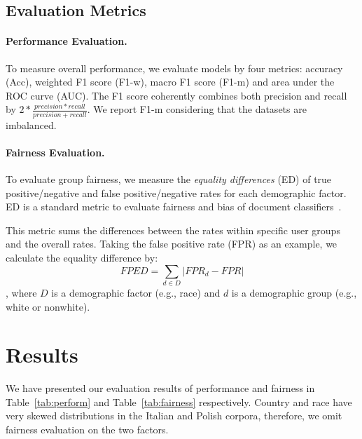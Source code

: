 \subsection{Evaluation Metrics}

\paragraph{Performance Evaluation.}
To measure overall performance, we evaluate models by four metrics: accuracy (Acc), weighted F1 score (F1-w), macro F1 score (F1-m) and area under the ROC curve (AUC). %
The F1 score coherently combines both precision and recall by $2*\frac{precision*recall}{precision+recall}$.
We report F1-m considering that the datasets are imbalanced.

\paragraph{Fairness Evaluation.}
To evaluate {group fairness}, we measure the \textit{equality differences} (ED) of true positive/negative and false positive/negative rates for each demographic factor. 
ED is a standard metric to evaluate fairness and bias of document classifiers~\cite{dixon2018measuring,park2018reducing,garg2019counterfactual}.

This metric sums the differences between the rates within specific user groups and the overall rates.
Taking the false positive rate (FPR) as an example, we calculate the equality difference by:
$$FPED = \sum_{d \in D}|FPR_d - FPR|$$
, where $D$ is a demographic factor (e.g., race) and $d$ is a demographic group (e.g., white or nonwhite).


\section{Results}
We have presented our evaluation results of performance and fairness in Table~\ref{tab:perform} and Table~\ref{tab:fairness} respectively.
Country and race have very skewed distributions in the Italian and Polish corpora, therefore, we omit fairness evaluation on the two factors.

